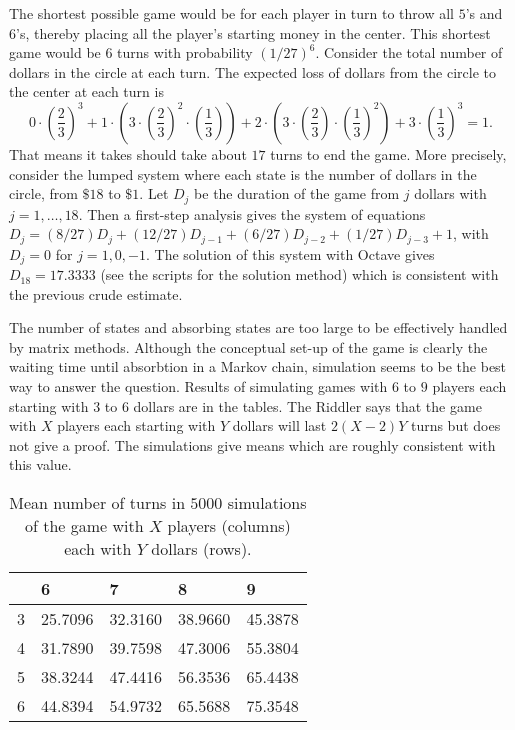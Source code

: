 \documentclass[12pt]{article}
\begin{document}
\begin{example}
    The shortest possible game would be for each player in turn to throw
    all \( 5 \)'s and \( 6 \)'s, thereby placing all the player's
    starting money in the center.  This shortest game would be \( 6 \)
    turns with probability \( (1/27)^6 \).  Consider the total number of
    dollars in the circle at each turn.  The expected loss of dollars
    from the circle to the center at each turn is
    \[
        0 \cdot \left( \frac{2}{3} \right)^3 + 1 \cdot \left( 3 \cdot
        \left( \frac{2}{3} \right)^2 \cdot \left( \frac{1}{3} \right)
        \right) + 2 \cdot \left( 3 \cdot \left( \frac{2}{3} \right)
        \cdot \left( \frac{1}{3} \right)^2 \right) + 3 \cdot \left( \frac
        {1}{3} \right)^3 = 1.
    \] That means it takes should take about \( 17 \) turns to end the
    game.  More precisely, consider the lumped system where each state
    is the number of dollars in the circle, from \( \$18 \) to \( \$1 \).
    Let \( D_j \) be the duration of the game from \( j \) dollars with \(
    j = 1, \dots, 18 \).  Then a first-step analysis gives the system of
    equations \( D_j = (8/27)D_j + (12/27)D_{j-1} + (6/27)D_{j-2} + (1/27)D_
    {j-3} + 1 \), with \( D_j = 0 \) for \( j = 1, 0, -1 \).  The
    solution of this system with Octave gives \( D_{18} = 17.3333 \)
    (see the scripts for the solution method)
    which is consistent with the previous crude estimate.

    The number of states and absorbing states are too large to be
    effectively handled by matrix methods.  Although the conceptual
    set-up of the game is clearly the waiting time until absorbtion in a
    Markov chain, simulation seems to be the best way to answer the
    question.  Results of simulating games with \( 6 \) to \( 9 \)
    players each starting with \( 3 \) to \( 6 \) dollars are in the
    tables.  The Riddler says that the game with \( X \) players each
    starting with \( Y \) dollars will last \( 2(X-2)Y \) turns but does
    not give a proof. The simulations give means which are roughly consistent
    with this value.
    \begin{table}
        \centering
        \begin{tabular}{l | llll}
                   & 6       & 7       & 8       & 9       \\ 
            \hline
            3      & 25.7096 & 32.3160 & 38.9660 & 45.3878 \\ 
            4      & 31.7890 & 39.7598 & 47.3006 & 55.3804 \\ 
            5      & 38.3244 & 47.4416 & 56.3536 & 65.4438 \\ 
            6      & 44.8394 & 54.9732 & 65.5688 & 75.3548
        \end{tabular}
        \caption{Mean number of turns in \( 5000 \) simulations of the
        game with \( X \) players (columns) each with \( Y \) dollars (rows).}
        \label{tab:waitingtimeabsorbtion:lcrmean}
    \end{table}


\end{example}
\end{document}
